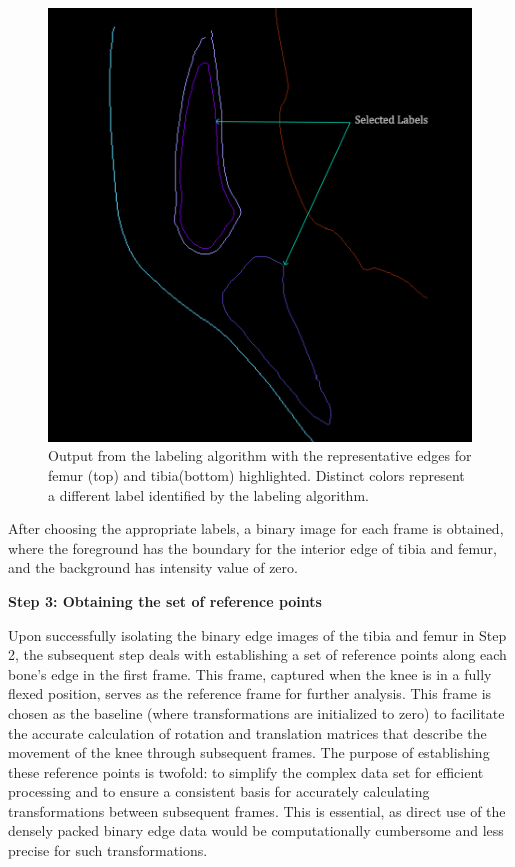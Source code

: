 \documentclass{micro-econ-thesis}
\begin{document}
\begin{figure}[H]
	\centering
	\includegraphics[width=0.7\linewidth]{label_selected}
	\caption{Output from the labeling algorithm with the representative edges for femur (top) and tibia(bottom) highlighted. Distinct colors represent a different label identified by the labeling algorithm.}
	\label{fig:labelimg}
\end{figure}
 
After choosing the appropriate labels, a binary image for each frame is obtained, where the foreground has the boundary for the interior edge of tibia and femur, and the background has intensity value of zero.   

\textbf{Step 3: Obtaining the set of reference points}

Upon successfully isolating the binary edge images of the tibia and femur in Step 2, the subsequent step deals with establishing a set of reference points along each bone's edge in the first frame. This frame, captured when the knee is in a fully flexed position, serves as the reference frame for further analysis.  This frame is chosen as the baseline (where transformations are initialized to zero) to facilitate the accurate calculation of rotation and translation matrices that describe the movement of the knee through subsequent frames. The purpose of establishing these reference points is twofold: to simplify the complex data set for efficient processing and to ensure a consistent basis for accurately calculating transformations between subsequent frames. This is essential, as direct use of the densely packed binary edge data would be computationally cumbersome and less precise for such transformations.
\end{document}

